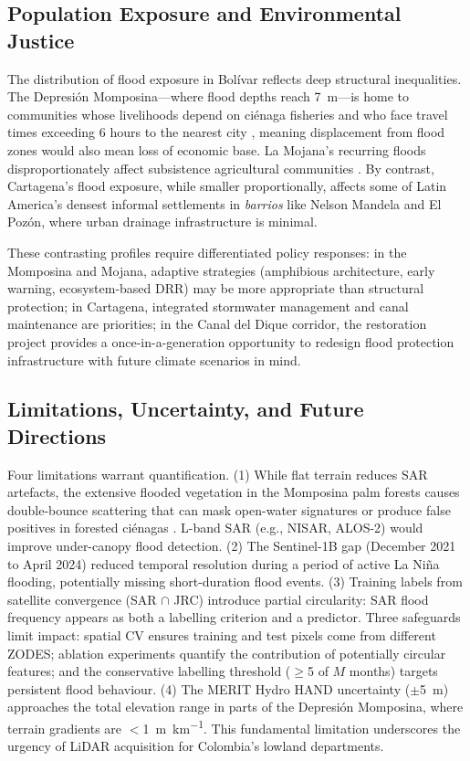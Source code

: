 \documentclass{article}
\begin{document}
\subsection{Population Exposure and Environmental Justice}

The distribution of flood exposure in Bol\'ivar reflects deep structural inequalities. The Depresi\'on Momposina---where flood depths reach \SI{7}{\metre}---is home to communities whose livelihoods depend on ci\'enaga fisheries and who face travel times exceeding 6 hours to the nearest city \citep{Weiss2018}, meaning displacement from flood zones would also mean loss of economic base. La Mojana's recurring floods disproportionately affect subsistence agricultural communities \citep{AdaptationFundMojana}. By contrast, Cartagena's flood exposure, while smaller proportionally, affects some of Latin America's densest informal settlements in \textit{barrios} like Nelson Mandela and El Pozón, where urban drainage infrastructure is minimal.

These contrasting profiles require differentiated policy responses: in the Momposina and Mojana, adaptive strategies (amphibious architecture, early warning, ecosystem-based DRR) may be more appropriate than structural protection; in Cartagena, integrated stormwater management and canal maintenance are priorities; in the Canal del Dique corridor, the restoration project provides a once-in-a-generation opportunity to redesign flood protection infrastructure with future climate scenarios in mind.

\subsection{Limitations, Uncertainty, and Future Directions}
\label{sec:limitations}

Four limitations warrant quantification. (1) While flat terrain reduces SAR artefacts, the extensive flooded vegetation in the Momposina palm forests causes double-bounce scattering that can mask open-water signatures or produce false positives in forested ci\'enagas \citep{Betancourt2020, Clement2018}. L-band SAR (e.g., NISAR, ALOS-2) would improve under-canopy flood detection. (2) The Sentinel-1B gap (December 2021 to April 2024) reduced temporal resolution during a period of active La Ni\~na flooding, potentially missing short-duration flood events. (3) Training labels from satellite convergence (SAR $\cap$ JRC) introduce partial circularity: SAR flood frequency appears as both a labelling criterion and a predictor. Three safeguards limit impact: spatial CV ensures training and test pixels come from different ZODES; ablation experiments quantify the contribution of potentially circular features; and the conservative labelling threshold ($\geq$5 of $M$ months) targets persistent flood behaviour. (4) The MERIT Hydro HAND uncertainty ($\pm$\SI{5}{\metre}) approaches the total elevation range in parts of the Depresi\'on Momposina, where terrain gradients are $<$\SI{1}{\metre\per\kilo\metre}. This fundamental limitation underscores the urgency of LiDAR acquisition for Colombia's lowland departments.
\end{document}

